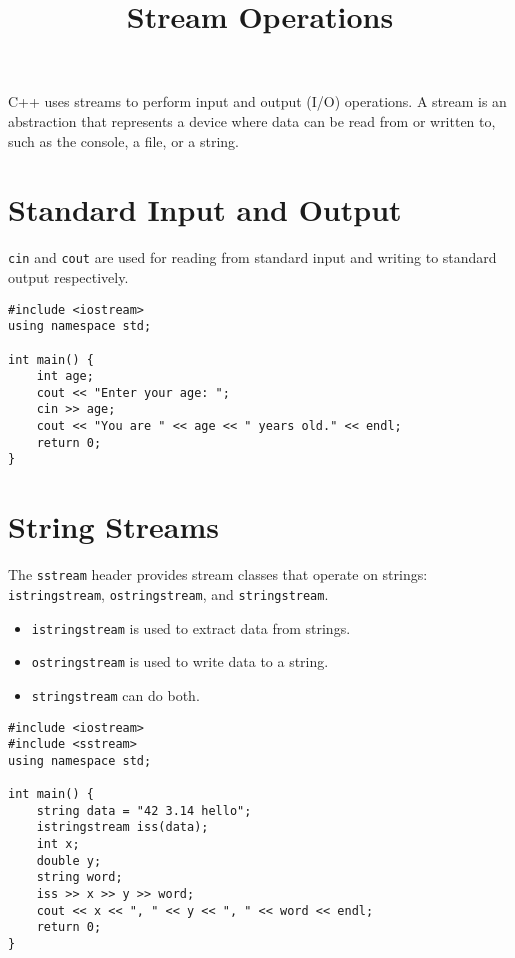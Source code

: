 \documentclass{article}
\title{Stream Operations}
\author{}
\date{}
\begin{document}
\maketitle


C++ uses streams to perform input and output (I/O) operations. A stream is an abstraction that represents a device where data can be read from or written to, such as the console, a file, or a string.

\section{Standard Input and Output}

\texttt{cin} and \texttt{cout} are used for reading from standard input and writing to standard output respectively.

\begin{lstlisting}[style=cppstyle]
#include <iostream>
using namespace std;

int main() {
    int age;
    cout << "Enter your age: ";
    cin >> age;
    cout << "You are " << age << " years old." << endl;
    return 0;
}
\end{lstlisting}

\section{String Streams}

The \texttt{sstream} header provides stream classes that operate on strings: \texttt{istringstream}, \texttt{ostringstream}, and \texttt{stringstream}.

\begin{itemize}
  \item \texttt{istringstream} is used to extract data from strings.
  \item \texttt{ostringstream} is used to write data to a string.
  \item \texttt{stringstream} can do both.
\end{itemize}

\begin{lstlisting}[style=cppstyle]
#include <iostream>
#include <sstream>
using namespace std;

int main() {
    string data = "42 3.14 hello";
    istringstream iss(data);
    int x;
    double y;
    string word;
    iss >> x >> y >> word;
    cout << x << ", " << y << ", " << word << endl;
    return 0;
}
\end{lstlisting}
\end{document}
